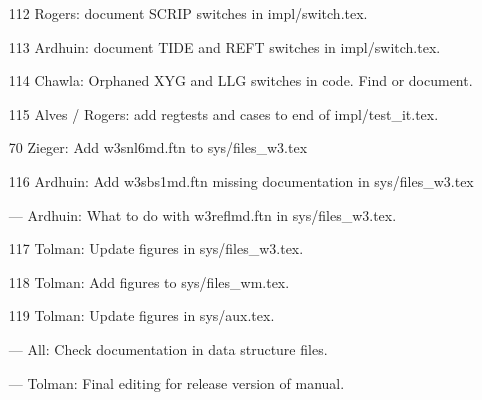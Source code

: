 \begin{itemize}
\item[112] Rogers: document SCRIP switches in impl/switch.tex.

\item[113] Ardhuin: document TIDE and REFT switches in impl/switch.tex.

\item[114] Chawla: Orphaned XYG and LLG switches in code. Find or document.

\item[115] Alves / Rogers: add regtests and cases to end of impl/test\_it.tex.

\item[70] Zieger: Add w3snl6md.ftn to sys/files\_w3.tex

\item[116] Ardhuin: Add w3sbs1md.ftn missing documentation in sys/files\_w3.tex

\item[---] Ardhuin: What to do with w3reflmd.ftn in sys/files\_w3.tex.

\item[117] Tolman: Update figures in sys/files\_w3.tex.

\item[118] Tolman: Add figures to sys/files\_wm.tex.

\item[119] Tolman: Update figures in sys/aux.tex.


\item[---] All: Check documentation in data structure files.

\item[---] Tolman: Final editing for release version of manual.

\end{itemize}

\bpage
\pagestyle{empty}
